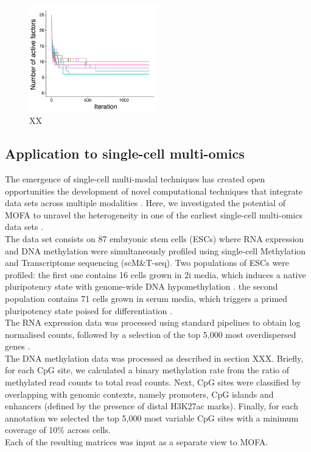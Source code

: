 \begin{figure}[H]
	\centering 	
	\includegraphics[width=0.5\textwidth]{MOFA_nfactors}
	\caption{XX}
	\label{fig:MOFA_nfactors}
\end{figure}



\subsection{Application to single-cell multi-omics} \label{section:mofa_scmt}

The emergence of single-cell multi-modal techniques has created open opportunities the development of novel computational techniques that integrate data sets across multiple modalities \cite{XX}. Here, we investigated the potential of MOFA to unravel the heterogeneity in one of the earliest single-cell multi-omics data sets \cite{Angermuelller2016}.\\
The data set consists on 87 embryonic stem cells (ESCs) where RNA expression and DNA methylation were simultaneously profiled using single-cell Methylation and Transcriptome sequencing (scM\&T-seq).
Two populations of ESCs were profiled: the first one contains 16 cells grown in 2i media, which induces a native pluripotency state with genome-wide DNA hypomethylation \cite{XX}. the second population contains 71 cells grown in serum media, which triggers a primed pluripotency state poised for differentiation \cite{XX}.\\

The RNA expression data was processed using standard pipelines \cite{Lun2016} to obtain log normalised counts, followed by a selection of the top 5,000 most overdispersed genes \cite{XX}.\\
The DNA methylation data was processed as described in section XXX. Briefly, for each CpG site, we calculated a binary methylation rate from the ratio of methylated read counts to total read counts. Next, CpG sites were classified by overlapping with genomic contexts, namely promoters, CpG islands and enhancers (defined by the presence of distal H3K27ac marks). Finally, for each annotation we selected the top 5,000 most variable CpG sites with a minimum coverage of 10\% across cells.\\
Each of the resulting matrices was input as a separate view to MOFA.\\

